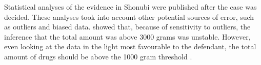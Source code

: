 \documentclass{article}
\begin{document}
    
     Statistical analyses of the evidence in Shonubi were published after the case was decided.
     These analyses took into account other potential sources of error, such as outliers and biased data. 
     \citet{gastwirth2000shonubi} showed that, because of sensitivity to outliers, %
     the inference that the total amount was above 3000 grams was unstable. 
		 	 However, even looking at the data in the light most favourable to the defendant, the total amount of drugs should be above the 1000 gram threshold  \citep{izenman2000introduction,gastwirth2000shonubi,izenman2000assessing}. 
	 
	 
\end{document}
